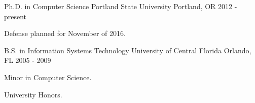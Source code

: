 

\begin{cventries}

  \cventry
    {Ph.D. in Computer Science} %
    {Portland State University} %
    {Portland, OR} %
    {2012 - present} %
    {
      \begin{cvitems} %
        \item {Defense planned for November of 2016.}
      \end{cvitems}
    }



  \cventry
    {B.S. in Information Systems Technology} %
    {University of Central Florida} %
    {Orlando, FL} %
    {2005 - 2009} %
    {
      \begin{cvitems} %
        \item {Minor in Computer Science.}
        \item {University Honors.}
      \end{cvitems}
    }

\end{cventries}
